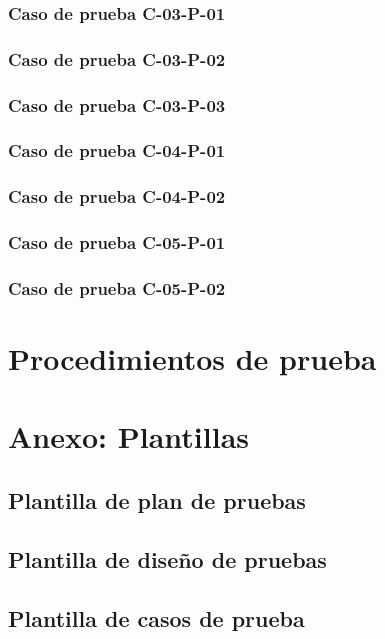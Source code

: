 \documentclass[10pt,a4paper]{article}
\begin{document}
			\subsubsection{Caso de prueba C-03-P-01}

			\subsubsection{Caso de prueba C-03-P-02}

			\subsubsection{Caso de prueba C-03-P-03}

			\subsubsection{Caso de prueba C-04-P-01}

			\subsubsection{Caso de prueba C-04-P-02}

			\subsubsection{Caso de prueba C-05-P-01}

			\subsubsection{Caso de prueba C-05-P-02}

\section{Procedimientos de prueba}

\section{Anexo: Plantillas}
	\subsection{Plantilla de plan de pruebas}

	\subsection{Plantilla de diseño de pruebas}

	\subsection{Plantilla de casos de prueba}

	
\end{document}
